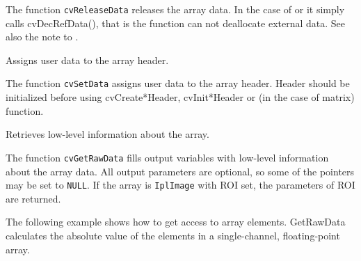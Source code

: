 \begin{description}
\end{description}


The function \texttt{cvReleaseData} releases the array data. In the case of  or  it simply calls cvDecRefData(), that is the function can not deallocate external data. See also the note to .

\fi

\label{SetData}

Assigns user data to the array header.


\begin{description}
\end{description}


The function \texttt{cvSetData} assigns user data to the array header. Header should be initialized before using cvCreate*Header, cvInit*Header or  (in the case of matrix) function.

\ifC
{}\label{GetRawData}

Retrieves low-level information about the array.


\begin{description}
\end{description}

The function \texttt{cvGetRawData} fills output variables with low-level information about the array data. All output parameters are optional, so some of the pointers may be set to \texttt{NULL}. If the array is \texttt{IplImage} with ROI set, the parameters of ROI are returned.

The following example shows how to get access to array elements. GetRawData calculates the absolute value of the elements in a single-channel, floating-point array.

